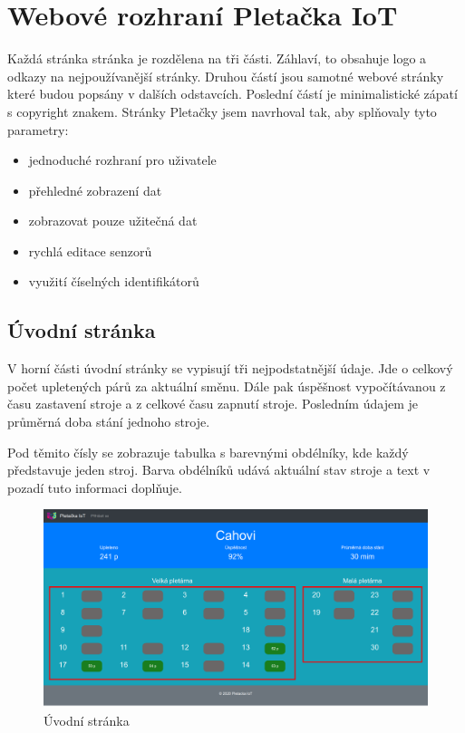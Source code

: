\section{Webové rozhraní Pletačka IoT}
Každá stránka stránka je rozdělena na tři části. Záhlaví, to obsahuje logo a odkazy na nejpoužívanější stránky.
Druhou částí jsou samotné webové stránky které budou popsány v dalších odstavcích.
Poslední částí je minimalistické zápatí s copyright znakem.\newline
Stránky Pletačky jsem navrhoval tak, aby splňovaly tyto parametry:

\fxnote[author=JA]{\textcolor{mygreen}{Doplnit obrázky stránek pod kapitolu nebo jeden list s fotkami}}

\begin{itemize}
    \item jednoduché rozhraní pro uživatele
    \item přehledné zobrazení dat
    \item zobrazovat pouze užitečná dat
    \item rychlá editace senzorů
    \item využití číselných identifikátorů
\end{itemize}


\subsection{Úvodní stránka}
V horní části úvodní stránky se vypisují tři nejpodstatnější údaje.
Jde o celkový počet upletených párů za aktuální směnu.
Dále pak úspěšnost vypočítávanou z času zastavení stroje a z celkové času zapnutí stroje.
Posledním údajem je průměrná doba stání jednoho stroje.   

Pod těmito čísly se zobrazuje tabulka s barevnými obdélníky, kde každý představuje jeden stroj.
Barva obdélníků udává aktuální stav stroje a text v pozadí tuto informaci doplňuje. 

\begin{figure}[htbp]
    \centering
    \includegraphics[width=\textwidth]{img/Home.png}
    \caption{Úvodní stránka}
    \label{fig:webUvod}
\end{figure}

